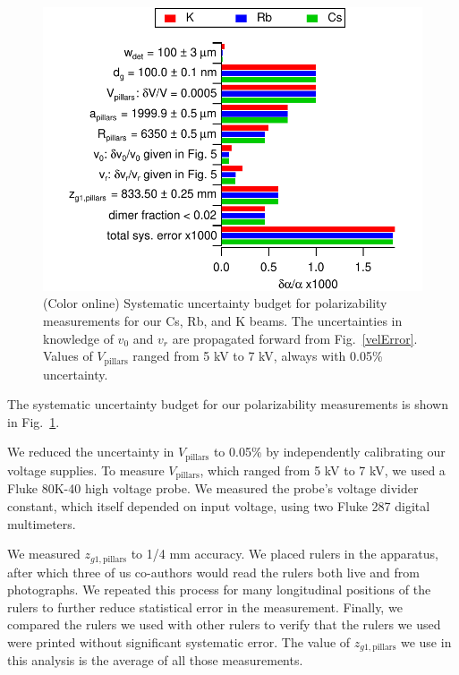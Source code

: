 \documentclass[twocolumn,prl,showpacs,superscriptaddress,longbibliography]{revtex4-1}   %
\newcommand{\figref}[1]{Fig.~\ref{#1}}
\begin{document}
\begin{figure}
\includegraphics[width=\linewidth,keepaspectratio]{displayPolErrors.pdf}
\caption{\label{polError}(Color online) Systematic uncertainty budget for polarizability measurements for our Cs, Rb, and K beams.
The uncertainties in knowledge of $v_0$ and $v_r$ are propagated forward from \figref{velError}.
Values of $V_{\mathrm{pillars}}$ ranged from 5 kV to 7 kV, always with 0.05\% uncertainty.}
\end{figure}

The systematic uncertainty budget for our polarizability measurements is shown in \figref{polError}. 

We reduced the uncertainty in $V_{\mathrm{pillars}}$ to 0.05\% by independently calibrating our voltage supplies. To measure $V_{\mathrm{pillars}}$, which ranged from 5 kV to 7 kV, we used a Fluke 80K-40 high voltage probe. We measured the probe's voltage divider constant, which itself depended on input voltage, using two Fluke 287 digital multimeters.

We measured $z_{g1,\mathrm{pillars}}$ to 1/4 mm accuracy. We placed rulers in the apparatus, after which three of us co-authors would read the rulers both live and from photographs. We repeated this process for many longitudinal positions of the rulers to further reduce statistical error in the measurement. Finally, we compared the rulers we used with other rulers to verify that the rulers we used were printed without significant systematic error. The value of $z_{g1,\mathrm{pillars}}$ we use in this analysis is the average of all those measurements. 
\end{document}
